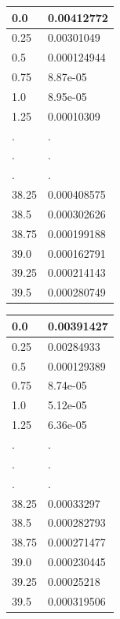 \documentclass[a4paper, 12pt]{article}
\begin{document}
\begin{center}
\begin{tabular}{|l|l|}\hline
0.0&0.00412772\\ \hline
0.25&0.00301049\\ \hline
0.5&0.000124944\\ \hline
0.75&8.87e-05\\ \hline
1.0&8.95e-05\\ \hline
1.25&0.00010309\\ \hline
.&.\\
.&.\\
.&.\\
38.25&0.000408575\\ \hline
38.5&0.000302626\\ \hline
38.75&0.000199188\\ \hline
39.0&0.000162791\\ \hline
39.25&0.000214143\\ \hline
39.5&0.000280749\\ \hline
	\end{tabular}
\end{center}
\newpage
\begin{center}
\begin{tabular}{|l|l|}\hline
0.0&0.00391427\\ \hline
0.25&0.00284933\\ \hline
0.5&0.000129389\\ \hline
0.75&8.74e-05\\ \hline
1.0&5.12e-05\\ \hline
1.25&6.36e-05\\ \hline
.&.\\
.&.\\
.&.\\
38.25&0.00033297\\ \hline
38.5&0.000282793\\ \hline
38.75&0.000271477\\ \hline
39.0&0.000230445\\ \hline
39.25&0.00025218\\ \hline
39.5&0.000319506\\ \hline
	\end{tabular}
\end{center}
\end{document}
